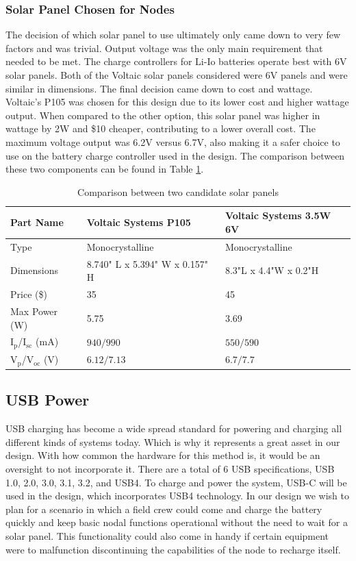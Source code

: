 \subsubsection{Solar Panel Chosen for Nodes}
The decision of which solar panel to use ultimately only came down to very few factors and was trivial. Output voltage was the only main requirement that needed to be met. The charge controllers for Li-Io batteries operate best with 6V solar panels. Both of the Voltaic solar panels considered were 6V panels and were similar in dimensions. The final decision came down to cost and wattage. Voltaic's P105 was chosen for this design due to its lower cost and higher wattage output. When compared to the other option, this solar panel was higher in wattage by 2W and \$10 cheaper, contributing to a lower overall cost. The maximum voltage output was 6.2V versus 6.7V, also making it a safer choice to use on the battery charge controller used in the design. The comparison between these two components can be found in Table \ref{tab:solar-panel-part-comparison}.

\begin{table}
\centering
\caption{Comparison between two candidate solar panels}
\begin{tabular}{| l | >{\columncolor[HTML]{\tblhl}}l | l |}
\hline
Part Name & Voltaic Systems P105 & Voltaic Systems 3.5W 6V \\
\hline\hline
Type & Monocrystalline & Monocrystalline \\\hline
Dimensions & 8.740" L x 5.394" W x 0.157" H & 8.3"L x 4.4"W x 0.2"H \\\hline
Price (\$) & 35 & 45 \\\hline
Max Power (W) & 5.75 & 3.69 \\\hline
I$_{\text{p}}$/I$_{\text{sc}}$ (mA) & $940/990$ & $550/590$ \\\hline
V$_{\text{p}}$/V$_{\text{oc}}$ (V) & $6.12/7.13$ & $6.7/7.7$ \\\hline
\end{tabular}
\label{tab:solar-panel-part-comparison}
\end{table}

\subsection{USB Power}
USB charging has become a wide spread standard for powering and charging all different kinds of systems today. Which is why it represents a great asset in our design. With how common the hardware for this method is, it would be an oversight to not incorporate it. There are a total of 6 USB specifications, USB 1.0, 2.0, 3.0, 3.1, 3.2, and USB4. To charge and power the system, USB-C will be used in the design, which incorporates USB4 technology. In our design we wish to plan for a scenario in which a field crew could come and charge the battery quickly and keep basic nodal functions operational without the need to wait for a solar panel. This functionality could also come in handy if certain equipment were to malfunction discontinuing the capabilities of the node to recharge itself.  


